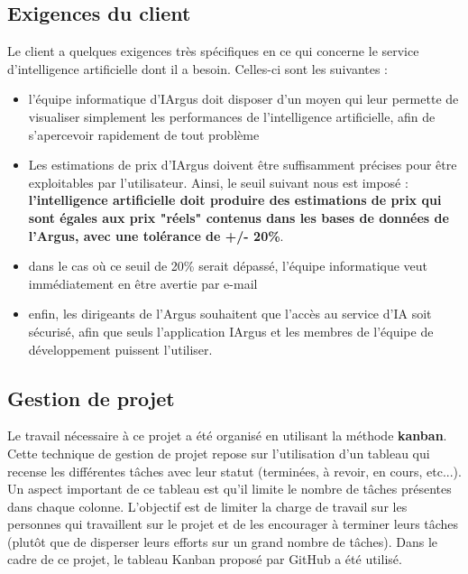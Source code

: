 \documentclass[french]{article}
\begin{document}
    \subsection{Exigences du client}
    Le client a quelques exigences très spécifiques en ce qui concerne le service d'intelligence artificielle dont il a besoin. Celles-ci sont les suivantes :
    \begin{itemize}
        \item l'équipe informatique d'IArgus doit disposer d'un moyen qui leur permette de visualiser simplement les performances de l'intelligence artificielle, afin de s'apercevoir rapidement de tout problème
        \item Les estimations de prix d'IArgus doivent être suffisamment précises pour être exploitables par l'utilisateur. Ainsi, le seuil suivant nous est imposé : \textbf{l'intelligence artificielle doit produire des estimations de prix qui sont égales aux prix "réels" contenus dans les bases de données de l'Argus, avec une tolérance de +/- 20\%}. 
        \item dans le cas où ce seuil de 20\% serait dépassé, l'équipe informatique veut immédiatement en être avertie par e-mail
        \item enfin, les dirigeants de l'Argus souhaitent que l'accès au service d'IA soit sécurisé, afin que seuls l'application IArgus et les membres de l'équipe de développement puissent l'utiliser.
    \end{itemize}

    \subsection{Gestion de projet}

    Le travail nécessaire à ce projet a été organisé en utilisant la méthode \textbf{kanban}. Cette technique de gestion de projet repose sur l'utilisation d'un tableau qui recense les différentes tâches avec leur statut (terminées, à revoir, en cours, etc...). Un aspect important de ce tableau est qu'il limite le nombre de tâches présentes dans chaque colonne. L'objectif est de limiter la charge de travail sur les personnes qui travaillent sur le projet et de les encourager à terminer leurs tâches (plutôt que de disperser leurs efforts sur un grand nombre de tâches). Dans le cadre de ce projet, le tableau Kanban proposé par GitHub a été utilisé.
\end{document}
